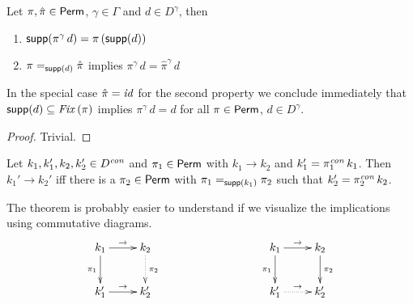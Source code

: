 \documentclass[12pt,a4paper]{report}
\newcommand{\scon}{\nstyle{con}}
\newcommand{\id}{\nstyle{id}}
\newcommand{\Fix}[1]{\nstyle{Fix}\,(#1)}
\begin{document}
\begin{lemma}[Permutations] \label{lemma:Permutations}
 Let $\pi,\hat{\pi}\in\mathsf{Perm}$, $\gamma\in\Gamma$ and $d \in D^\gamma$, then
 \begin{enumerate}
   \item $\mathsf{supp}(\pi^\gamma\,d) = \pi\,(\mathsf{supp}(d))$
   \item $\pi =_{\mathsf{supp}(d)} \hat{\pi}$ implies $\pi^\gamma\,d = \hat{\pi}^\gamma\,d$
 \end{enumerate}
\end{lemma}

In the special case $\hat{\pi} = \id$ for the second property we conclude immediately that
$\supp{d} \subseteq \Fix{\pi}$ implies $\pi^\gamma\,d = d$ for all $\pi\in\mathsf{Perm}$, $d\in D^\gamma$.

\begin{proof}
 Trivial.
\end{proof}

\begin{theorem} \label{theorem:small_steps_and_permutations}
 Let $k_1,k_1',k_2,k_2'\in D^\scon$ and $\pi_1\in\mathsf{Perm}$ with
 $k_1 \to k_2$ and $k_1' = \pi_1^\scon\,k_1$. Then $k_1' \to k_2'$ iff there is a $\pi_2\in\mathsf{Perm}$
 with $\pi_1 =_{\mathsf{supp}(k_1)} \pi_2$ such that $k_2' = \pi_2^\scon\,k_2$.
\end{theorem}

The theorem is probably easier to understand if we visualize the implications using commutative
diagrams.
\[
 \xymatrix{
   k_1 \ar[r]^{\to} \ar[d]_{\pi_1} & k_2 \ar@{.>}[d]^{\pi_2} \\
   k_1' \ar[r]^{\to} & k_2'
 }
 \hspace*{3cm}
 \xymatrix{
   k_1 \ar[r]^{\to} \ar[d]_{\pi_1} & k_2 \ar[d]^{\pi_2} \\
   k_1' \ar@{.>}[r]^{\to} & k_2'
 }
\]
\end{document}
